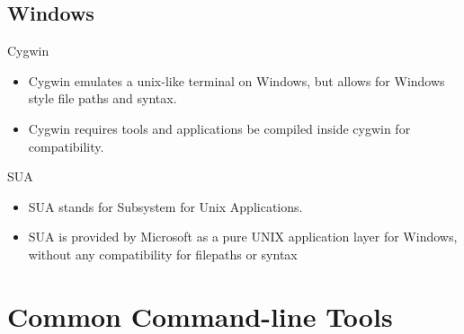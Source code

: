 \documentclass[10pt]{beamer}
\begin{document}
\subsection{Windows}
\begin{frame}{Cygwin}
\begin{itemize}
\item Cygwin emulates a unix-like terminal on Windows, but allows for Windows style file paths and syntax.
\item Cygwin requires tools and applications be compiled inside cygwin for compatibility.
\end{itemize}
\end{frame}

\begin{frame}{SUA}
\begin{itemize}
\item SUA stands for Subsystem for Unix Applications.
\item SUA is provided by Microsoft as a pure UNIX application layer for Windows, without any compatibility for filepaths or syntax
\end{itemize}
\end{frame}

\section{Common Command-line Tools}
\end{document}
